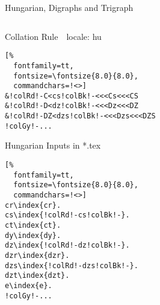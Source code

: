 \documentclass[aspectratio=169,10pt]{beamer}
\begin{document}
\begin{frame}[fragile]{Hungarian, Digraphs and Trigraph}

\begin{columns}
\begin{column}{60mm}

\setmonofont{Noto Sans Mono}
\begin{block}{Collation Rule~~\scriptsize locale: hu}
\begin{Verbatim}[%
  fontfamily=tt,
  fontsize=\fontsize{8.0}{8.0},
  commandchars=!<>]
&!colRd!-C<cs!colBk!-<<<Cs<<<CS
&!colRd!-D<dz!colBk!-<<<Dz<<<DZ
&!colRd!-DZ<dzs!colBk!-<<<Dzs<<<DZS
!colGy!-...
\end{Verbatim}
\end{block}
\begin{exampleblock}{Hungarian Inputs in *.tex}
\begin{Verbatim}[%
  fontfamily=tt,
  fontsize=\fontsize{8.0}{8.0},
  commandchars=!<>]
cr\index{cr}.
cs\index{!colRd!-cs!colBk!-}.
ct\index{ct}.
dy\index{dy}.
dz\index{!colRd!-dz!colBk!-}.
dzr\index{dzr}.
dzs\index{!colRd!-dzs!colBk!-}.
dzt\index{dzt}.
e\index{e}.
!colGy!-...
\end{Verbatim}
\end{exampleblock}
\end{column}

\begin{column}{60mm}
\begin{center}
%
\end{center}
\end{column}
\end{columns}

\end{frame}

\end{document}
